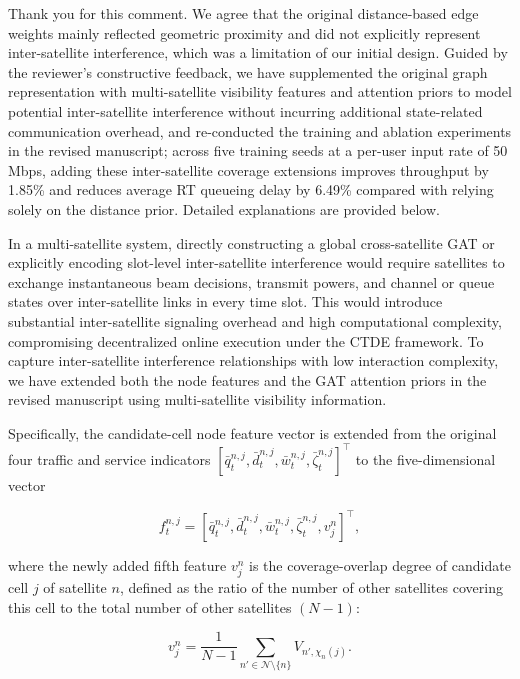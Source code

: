 \documentclass[11pt,a4paper]{article}
\newcommand{\qrev}[1]{{\color{qinrev}#1}}
\begin{document}
Thank you for this comment. We agree that the original distance-based edge weights mainly reflected geometric proximity and did not explicitly represent inter-satellite interference, which was a limitation of our initial design. Guided by the reviewer's constructive feedback, we have supplemented the original graph representation with multi-satellite visibility features and attention priors \qrev{to model potential inter-satellite interference without incurring additional state-related communication overhead,} and re-conducted the training and ablation experiments in the revised manuscript; across five training seeds at a per-user input rate of 50 Mbps, adding these inter-satellite coverage extensions improves throughput by 1.85\% and reduces average RT queueing delay by 6.49\% compared with relying solely on the distance prior. \qrev{Detailed explanations are provided below.}
\par

In a multi-satellite system, directly constructing a global cross-satellite GAT or explicitly encoding slot-level inter-satellite interference would require satellites to exchange instantaneous beam decisions, transmit powers, and channel or queue states over inter-satellite links in every time slot. This would introduce substantial inter-satellite signaling overhead and high computational complexity, compromising decentralized online execution under the CTDE framework. To capture inter-satellite interference relationships with low interaction complexity, we have extended both the node features and the GAT attention priors in the revised manuscript using multi-satellite visibility information.
\par

Specifically, the candidate-cell node feature vector is extended from the original four traffic and service indicators $[\bar q_t^{n,j},\bar d_t^{n,j},\bar w_t^{n,j},\bar\zeta_t^{n,j}]^\top$ to the five-dimensional vector
\par

\[
f_t^{n,j}=[\bar q_t^{n,j},\bar d_t^{n,j},\bar w_t^{n,j},\bar\zeta_t^{n,j},v_j^n]^\top,
\]

where the newly added fifth feature $v_j^n$ is the coverage-overlap degree of candidate cell $j$ of satellite $n$, defined as the ratio of the number of other satellites covering this cell to the total number of other satellites $(N-1)$:
\par

\[
v_j^n=\frac{1}{N-1}\sum_{n'\in\mathcal N\setminus\{n\}}V_{n',\chi_n(j)}.
\]
\end{document}
